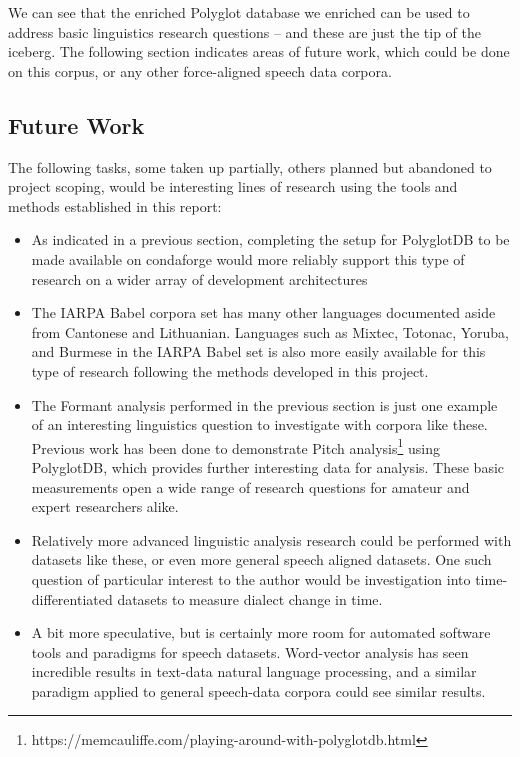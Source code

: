 \documentclass[11pt]{article}
\begin{document}
We can see that the enriched Polyglot database we enriched can be used to address basic linguistics research questions -- and these are just the tip of the iceberg. The following section indicates areas of future work, which could be done on this corpus, or any other force-aligned speech data corpora.

\subsection{Future Work}

The following tasks, some taken up partially, others planned but abandoned to project scoping, would be interesting lines of research using the tools and methods established in this report:

\begin{itemize}
  \item As indicated in a previous section, completing the setup for PolyglotDB to be made available on condaforge would more reliably support this type of research on a wider array of development architectures
  \item The IARPA Babel corpora set has many other languages documented aside from Cantonese and Lithuanian. Languages such as Mixtec, Totonac, Yoruba, and Burmese in the IARPA Babel set is also more easily available for this type of research following the methods developed in this project.
  \item The Formant analysis performed in the previous section is just one example of an interesting linguistics question to investigate with corpora like these. Previous work has been done to demonstrate Pitch analysis\footnote{https://memcauliffe.com/playing-around-with-polyglotdb.html} using PolyglotDB, which provides further interesting data for analysis. These basic measurements open a wide range of research questions for amateur and expert researchers alike.
  \item Relatively more advanced linguistic analysis research could be performed with datasets like these, or even more general speech aligned datasets. One such question of particular interest to the author would be investigation into time-differentiated datasets to measure dialect change in time.
\item A bit more speculative, but is certainly more room for automated software tools and paradigms for speech datasets. Word-vector analysis has seen incredible results in text-data natural language processing, and a similar paradigm applied to general speech-data corpora could see similar results.
\end{itemize}
\end{document}
